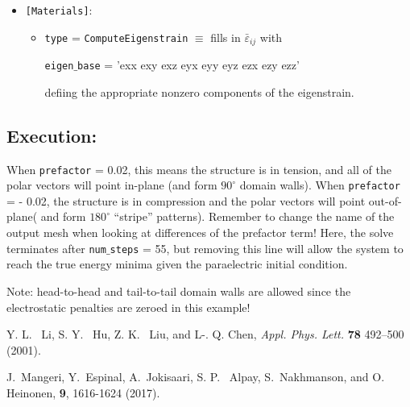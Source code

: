 \documentclass[paper=a4, fontsize=14pt]{scrartcl} %
\numberwithin{equation}{section} %
\numberwithin{figure}{section} %
\numberwithin{table}{section} %
\begin{document}
\begin{itemize}

\vspace{-15pt}

\item[] 

\texttt{[Materials]}:

\vspace*{-12pt}

\begin{itemize}

\item \texttt{type} = \texttt{ComputeEigenstrain} $\equiv$ fills in $\bar{\varepsilon}_{ij}$ with

\texttt{eigen}$\_$\texttt{base} = 'exx exy exz eyx eyy eyz ezx ezy ezz' 

defiing the appropriate nonzero components of the eigenstrain.

\end{itemize}

\end{itemize}

\vspace*{-30pt}

\subsection*{Execution:}

When \texttt{prefactor} = 0.02, this means the structure is in tension, and all of the polar vectors will point in-plane (and form $90^\circ$ domain walls). When \texttt{prefactor} = - 0.02, the structure is in compression and the polar vectors will point out-of-plane( and form $180^\circ$ ``stripe'' patterns). Remember to change the name of the output mesh when looking at differences of the prefactor term! Here, the solve terminates after \texttt{num}$\_$\texttt{steps} = 55, but removing this line will allow the system to reach the true energy minima given the paraelectric initial condition.

Note: head-to-head and tail-to-tail domain walls are allowed since the electrostatic penalties are zeroed in this example!



\newpage
\begin{thebibliography}{1}

Y. L. ~Li, S. Y. ~Hu, Z. K. ~Liu, and L-. Q. Chen,
\newblock \emph{Appl. Phys. Lett.} \textbf{78} 492--500 (2001).

J.~Mangeri, Y.~Espinal, A.~Jokisaari, S. P. ~Alpay, S.~Nakhmanson, and O. Heinonen,
 \textbf{9}, 1616-1624 (2017).

\end{thebibliography}
\end{document}
